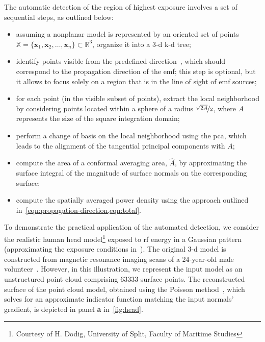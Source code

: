 The automatic detection of the region of highest exposure involves a set of sequential steps, as outlined below:
\begin{itemize}
    \item assuming a nonplanar model is represented by an oriented set of points $\mathbb{X} = \{ \mathbf{x}_1, \mathbf{x}_2, \dots, \mathbf{x}_n \} \subset \mathbb{R}^3$, organize it into a \gls{3-d} \gls{k-d} tree;
    \item identify points visible from the predefined direction~\cite{Katz2007Direct}, which should correspond to the propagation direction of the \gls{emf}; this step is optional, but it allows to focus solely on a region that is in the line of sight of \gls{emf} sources;
    \item for each point (in the visible subset of points), extract the local neighborhood by considering points located within a sphere of a radius $\nicefrac{\sqrt{2 A}}{2}$, where $A$ represents the size of the square integration domain;
    \item perform a change of basis on the local neighborhood using the \gls{pca}, which leads to the alignment of the tangential principal components with $A$;
    \item compute the area of a conformal averaging area, $\hat A$, by approximating the surface integral of the magnitude of surface normals on the corresponding surface;
    \item compute the spatially averaged power density using the approach outlined in~\cref{eqn:propagation-direction,eqn:total}.
\end{itemize} 

To demonstrate the practical application of the automated detection, we consider the realistic human head model\footnote{Courtesy of H. Dodig, University of Split, Faculty of Maritime Studies} exposed to \gls{rf} energy in a Gaussian pattern~\cite{Foster2016Thermal} (approximating the exposure conditions in~\cite{Colombi2015Implications}).
The original \gls{3-d} model is constructed from magnetic resonance imaging scans of a \num{24}-year-old male volunteer~\cite{Laakso2015Intersubject}.
However, in this illustration, we represent the input model as an unstructured point cloud comprising \num{63333} surface points.
The reconstructed surface of the point cloud model, obtained using the Poisson method~\cite{Kazhdan2006Poisson}, which solves for an approximate indicator function matching the input normals' gradient, is depicted in panel \textbf{a} in~\cref{fig:head}.


